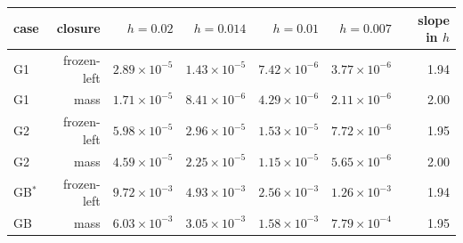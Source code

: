 \begin{tabular}{lrrrrrr}
\toprule
case & closure & $h=0.02$ & $h=0.014$ & $h=0.01$ & $h=0.007$ & slope in $h$ \\
\midrule
G1 & frozen-left & $2.89\times10^{-5}$ & $1.43\times10^{-5}$ & $7.42\times10^{-6}$ & $3.77\times10^{-6}$ & 1.94 \\
G1 & mass & $1.71\times10^{-5}$ & $8.41\times10^{-6}$ & $4.29\times10^{-6}$ & $2.11\times10^{-6}$ & 2.00 \\
G2 & frozen-left & $5.98\times10^{-5}$ & $2.96\times10^{-5}$ & $1.53\times10^{-5}$ & $7.72\times10^{-6}$ & 1.95 \\
G2 & mass & $4.59\times10^{-5}$ & $2.25\times10^{-5}$ & $1.15\times10^{-5}$ & $5.65\times10^{-6}$ & 2.00 \\
GB$^{*}$ & frozen-left & $9.72\times10^{-3}$ & $4.93\times10^{-3}$ & $2.56\times10^{-3}$ & $1.26\times10^{-3}$ & 1.94 \\
GB & mass & $6.03\times10^{-3}$ & $3.05\times10^{-3}$ & $1.58\times10^{-3}$ & $7.79\times10^{-4}$ & 1.95 \\
\bottomrule
\end{tabular}
